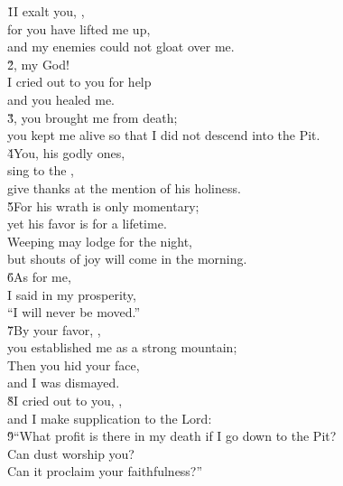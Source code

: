 \begin{poetry}
\poeml \v{1}I exalt you, , \\
\poemll    for you have lifted me up, \\
\poemlll       and my enemies could not gloat over me. \\
\poeml \v{2}, my God! \\
\poemll    I cried out to you for help \\
\poemlll       and you healed me. \\
\poeml \v{3}, you brought me from death; \\
\poemll    you kept me alive so that I did not descend into the Pit. \\
\poeml \v{4}You, his godly ones, \\
\poemll    sing to the , \\
\poemlll       give thanks at the mention of his holiness. \\
\poeml \v{5}For his wrath is only momentary; \\
\poemll    yet his favor is for a lifetime. \\
\poeml Weeping may lodge for the night, \\
\poemll    but shouts of joy will come in the morning. \\
\poeml \v{6}As for me, \\
\poemll    I said in my prosperity, \\
\poemlll       ``I will never be moved.'' \\
\poeml \v{7}By your favor, , \\
\poemll    you established me as a strong mountain; \\
\poeml Then you hid your face, \\
\poemll    and I was dismayed. \\
\poeml \v{8}I cried out to you, , \\
\poemll    and I make supplication to the Lord: \\
\poeml \v{9}``What profit is there in my death if I go down to the Pit? \\
\poemll    Can dust worship you? \\
\poemlll       Can it proclaim your faithfulness?'' \\

\end{poetry}
